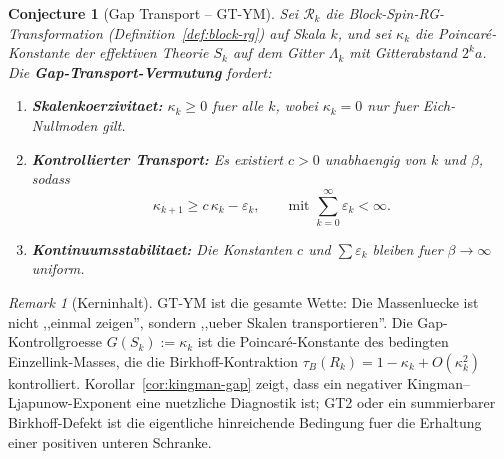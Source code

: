 \documentclass[12pt,a4paper]{article}
\theoremstyle{definition}
\theoremstyle{plain}
\newtheorem{conjecture}[definition]{Conjecture}
\theoremstyle{remark}
\newtheorem{remark}[definition]{Remark}
\begin{document}
\begin{conjecture}[Gap Transport -- GT-YM]\label{ax:gt-ym}
Sei $\mathcal{R}_k$ die Block-Spin-RG-Transformation (Definition~\ref{def:block-rg}) auf Skala $k$, und sei $\kappa_k$ die Poincar\'e-Konstante der effektiven Theorie $S_k$ auf dem Gitter $\Lambda_k$ mit Gitterabstand $2^k a$. Die \textbf{Gap-Transport-Vermutung} fordert:
\begin{enumerate}
\item[(GT1)] \textbf{Skalenkoerzivitaet:} $\kappa_k \geq 0$ fuer alle $k$, wobei $\kappa_k = 0$ nur fuer Eich-Nullmoden gilt.
\item[(GT2)] \textbf{Kontrollierter Transport:} Es existiert $c > 0$ unabhaengig von $k$ und $\beta$, sodass
\begin{equation}\label{eq:gap-transport}
  \kappa_{k+1} \geq c\, \kappa_k - \varepsilon_k, \qquad \text{mit } \sum_{k=0}^{\infty} \varepsilon_k < \infty.
\end{equation}
\item[(GT3)] \textbf{Kontinuumsstabilitaet:} Die Konstanten $c$ und $\sum \varepsilon_k$ bleiben fuer $\beta \to \infty$ uniform.
\end{enumerate}
\end{conjecture}

\begin{remark}[Kerninhalt]\label{rem:gt-core}
GT-YM ist die gesamte Wette: Die Massenluecke ist nicht ,,einmal zeigen'', sondern ,,ueber Skalen transportieren''. Die Gap-Kontrollgroesse $G(S_k) := \kappa_k$ ist die Poincar\'e-Konstante des bedingten Einzellink-Masses, die die Birkhoff-Kontraktion $\tau_B(R_k) = 1 - \kappa_k + O(\kappa_k^2)$ kontrolliert. Korollar~\ref{cor:kingman-gap} zeigt, dass ein negativer Kingman--Ljapunow-Exponent eine nuetzliche Diagnostik ist; GT2 oder ein summierbarer Birkhoff-Defekt ist die eigentliche hinreichende Bedingung fuer die Erhaltung einer positiven unteren Schranke.
\end{remark}
\end{document}

